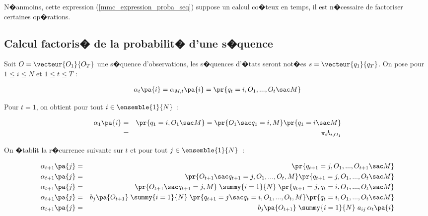 N�anmoins, cette expression (\ref{mmc_expression_proba_seq}) suppose un calcul co�teux en temps,
il est n�cessaire de factoriser certaines op�rations.








\subsection{Calcul factoris� de la probabilit� d'une s�quence}

\label{hmm_alpha_definition_forward}

Soit $O=\vecteur{O_1}{O_T}$ une s�quence d'observations, les s�quences d'�tats seront not�es $s=\vecteur{q_1}{q_T}$. On pose pour $1\leqslant i\leqslant N$ et $1\leqslant t\leqslant T$ :

        \begin{eqnarray}
        \alpha_{t} \pa{i}  = \alpha_{M,t} \pa{i}  = \pr{  q_{t}=i,O_{1},...,O_{t} \sac  M } \label{hmm_eq_alpha_1}
        \end{eqnarray}

Pour $t=1$, on obtient pour tout $i \in \ensemble{1}{N}$~:

        \begin{eqnarray}
        \alpha_{1} \pa{i} &=& \pr{ q_{1}=i,O_{1} \sac M }  = \pr{   O_{1} \sac  q_{1}=i,M}
                              \pr{ q_{1}=i       \sac M } \nonumber \\
                          &=& \pi_{i}b_{i,O_{1}} \label{mmc_alpha_forward_1} \label{hmm_eq_alpha_2}
        \end{eqnarray}


On �tablit la r�currence suivante sur $t$ et pour tout $j \in \ensemble{1}{N}$~:

        \begin{eqnarray}
        \alpha_{t+1}\pa{j}  &=& \pr{ q_{t+1}=j,O_{1},...,O_{t+1} \sac M } \nonumber\\
        \alpha_{t+1}\pa{j}  &=& \pr{ O_{t+1} \sac  q_{t+1}=j,O_{1},...,O_{t},M }
                                \pr{ q_{t+1}=j,O_{1},...,O_{t} \sac M } \nonumber\\
        \alpha_{t+1}\pa{j}  &=& \pr{ O_{t+1} \sac  q_{t+1}=j,M } \;
                                \summy{i=1}{N} \; \pr{ q_{t+1}=j,q_{t}=i,O_{1},...,O_{t} \sac  M} \nonumber\\
        \alpha_{t+1}\pa{j}  &=& b_{j}\pa{O_{t+1}} \; \summy{i=1}{N} \; \pr {  q_{t+1}=j \sac  q_{t}=i,O_{1},...,O_{t},M }
                                                                       \pr {  q_{t}=i,O_{1},...,O_{t} \sac  M } \nonumber\\
        \alpha_{t+1}\pa{j}  &=& b_{j}\pa{O_{t+1}} \; \summy{i=1}{N} \; a_{ij} \, \alpha_{t} \pa{i}
             \label{mmc_alpha_forward_2}\label{hmm_eq_alpha_3}
        \end{eqnarray}

